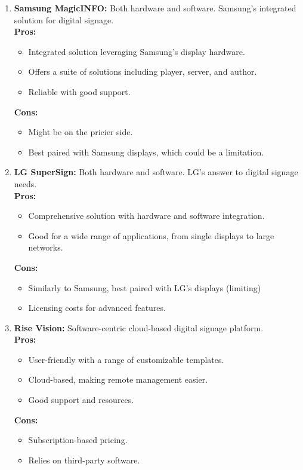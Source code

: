 \documentclass{exam}
\begin{document}
\begin{enumerate}
\item \textbf{Samsung MagicINFO:} Both hardware and software. Samsung's integrated solution for digital signage.\\
\bigskip
\textbf{Pros:}\\
\begin{itemize}
\item Integrated solution leveraging Samsung's display hardware.
\item Offers a suite of solutions including player, server, and author.
\item Reliable with good support.
\end{itemize}
\textbf{Cons:}\\
\begin{itemize}
\item Might be on the pricier side.
\item Best paired with Samsung displays, which could be a limitation.
\end{itemize}

\pagebreak
\item \textbf{LG SuperSign:} Both hardware and software. LG's answer to digital signage needs.\\
\bigskip
\textbf{Pros:}\\
\begin{itemize}
\item Comprehensive solution with hardware and software integration.
\item Good for a wide range of applications, from single displays to large networks.
\end{itemize}
\textbf{Cons:}\\
\begin{itemize}
\item Similarly to Samsung, best paired with LG's displays (limiting)
\item Licensing costs for advanced features.
\end{itemize}
\bigskip
\bigskip

\item \textbf{Rise Vision:} Software-centric cloud-based digital signage platform.\\
\bigskip
\textbf{Pros:}\\
\begin{itemize}
\item User-friendly with a range of customizable templates.
\item Cloud-based, making remote management easier.
\item Good support and resources.
\end{itemize}
\textbf{Cons:}\\
\begin{itemize}
\item Subscription-based pricing.
\item Relies on third-party software.
\end{itemize}


\end{enumerate}
\end{document}
